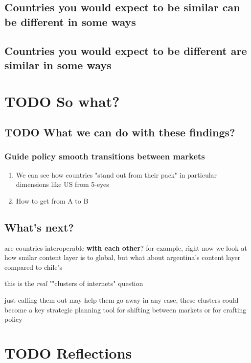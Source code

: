 \documentclass[11pt]{article}
\begin{document}
\subsection{Countries you would expect to be similar can be different in some ways}
\label{sec:org850ad25}
\subsection{Countries you would expect to be different are similar in some ways}
\label{sec:org6835238}
\section{{\bfseries\sffamily TODO} So what?}
\label{sec:org166fe69}
\subsection{{\bfseries\sffamily TODO} What we can do with these findings?}
\label{sec:orga88ef8b}
\subsubsection{Guide policy smooth transitions between markets}
\label{sec:org85c5804}
\begin{enumerate}
\item We can see how countries "stand out from their pack" in particular dimensions
\label{sec:orgd84deda}
like US from 5-eyes
\item How to get from A to B
\label{sec:org63cf1c1}
\end{enumerate}

\subsection{What's next?}
\label{sec:org93b59f4}

are countries interoperable \textbf{with each other}?
for example, right now we look at how smilar content layer is to global,
 but what about argentina's content layer compared to chile's

this is
the \emph{real} ""clusters of internets" question

just calling them out may help them go away
in any case, these clusters could become a key strategic planning tool
 for shifting between markets
 or for crafting policy

\section{{\bfseries\sffamily TODO} Reflections}
\label{sec:orgb699a0a}
\end{document}
